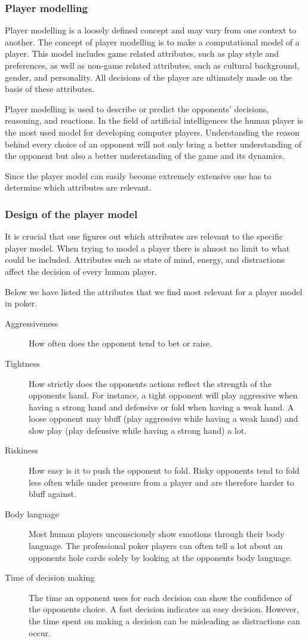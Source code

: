 \subsubsection{Player modelling}
\label{sec:pm}
Player modelling is a loosely defined concept and may vary from one context to another. The concept of player modelling is to make a computational model of a player. This model includes game related attributes, such as play style and preferences, as well as non-game related attributes, such as cultural background, gender, and personality. All decisions of the player are ultimately made on the basis of these attributes. 

Player modelling is used to describe or predict the opponents' decisions, reasoning, and reactions. In the field of artificial intelligences the human player is the most used model for developing computer players. Understanding the reason behind every choice of an opponent will not only bring a better understanding of the opponent but also a better understanding of the game and its dynamics.

Since the player model can easily become extremely extensive one has to determine which attributes are relevant.

\subsubsection{Design of the player model}
It is crucial that one figures out which attributes are relevant to the specific player model. When trying to model a player there is almost no limit to what could be included. Attributes such as state of mind, energy, and distractions affect the decision of every human player.  

Below we have listed the attributes that we find most relevant for a player model in poker.

\begin{description}
\item[Aggressiveness] How often does the opponent tend to bet or raise.
\item[Tightness] How strictly does the opponents actions reflect the strength of the opponents hand. For instance, a tight opponent will play aggressive when having a strong hand and defensive or fold when having a weak hand. A loose opponent may bluff (play aggressive while having a weak hand) and slow play (play defensive while having a strong hand) a lot.
\item[Riskiness] How easy is it to push the opponent to fold. Risky opponents tend to fold less often while under pressure from a player and are therefore harder to bluff against.
\item[Body language] Most human players unconsciously show emotions through their body language. The professional poker players can often tell a lot about an opponents hole cards solely by looking at the opponents body language.
\item[Time of decision making] The time an opponent uses for each decision can show the confidence of the opponents choice. A fast decision indicates an easy decision. However, the time spent on making a decision can be misleading as distractions can occur.
\end{description}


